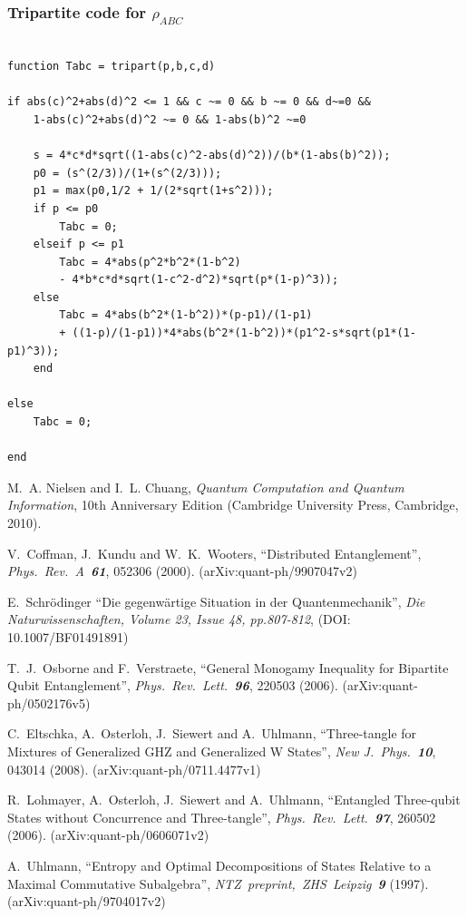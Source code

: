 \documentclass[12pt,a4paper]{article}
\numberwithin{equation}{section}
\begin{document}
\newpage

\subsubsection{Tripartite code for $\rho_{ABC}$}
\label{app:tripartiteCode}

\begin{verbatim}

function Tabc = tripart(p,b,c,d)

if abs(c)^2+abs(d)^2 <= 1 && c ~= 0 && b ~= 0 && d~=0 &&
    1-abs(c)^2+abs(d)^2 ~= 0 && 1-abs(b)^2 ~=0

    s = 4*c*d*sqrt((1-abs(c)^2-abs(d)^2))/(b*(1-abs(b)^2));
    p0 = (s^(2/3))/(1+(s^(2/3)));
    p1 = max(p0,1/2 + 1/(2*sqrt(1+s^2)));
    if p <= p0
        Tabc = 0;
    elseif p <= p1
        Tabc = 4*abs(p^2*b^2*(1-b^2)
        - 4*b*c*d*sqrt(1-c^2-d^2)*sqrt(p*(1-p)^3));
    else
        Tabc = 4*abs(b^2*(1-b^2))*(p-p1)/(1-p1)
        + ((1-p)/(1-p1))*4*abs(b^2*(1-b^2))*(p1^2-s*sqrt(p1*(1-p1)^3));
    end

else
    Tabc = 0;

end

\end{verbatim}

\newpage

\begin{thebibliography}{99}

M.~A. Nielsen
and
I.~L. Chuang,
{\it Quantum Computation and Quantum Information\/},
10th Anniversary Edition
(Cambridge University Press, Cambridge, 2010).

V.~Coffman, J.~Kundu
and
W.~K.~Wooters,
``Distributed Entanglement'',
{\it Phys.\ Rev.\ A\ \bf 61}, 052306 (2000).
(arXiv:quant-ph/9907047v2)

E.~Schr\"{o}dinger
``Die gegenwärtige Situation in der Quantenmechanik'',
{\it Die Naturwissenschaften, Volume 23, Issue 48, pp.807-812},
(DOI: 10.1007/BF01491891)

T.~J.~Osborne and F.~Verstraete,
``General Monogamy Inequality for Bipartite Qubit Entanglement'',
{\it Phys.\ Rev.\ Lett.\ \bf 96}, 220503 (2006).
(arXiv:quant-ph/0502176v5)

C.~Eltschka, A.~Osterloh, J.~Siewert and A.~Uhlmann,
``Three-tangle for Mixtures of Generalized GHZ and Generalized W States'',
{\it New J.\ Phys.\ \bf 10}, 043014 (2008).
(arXiv:quant-ph/0711.4477v1)

R.~Lohmayer, A.~Osterloh, J.~Siewert and A.~Uhlmann,
``Entangled Three-qubit States without Concurrence and Three-tangle'',
{\it Phys.\ Rev.\ Lett.\ \bf 97}, 260502 (2006).
(arXiv:quant-ph/0606071v2)

A.~Uhlmann,
``Entropy and Optimal Decompositions of States Relative to a Maximal Commutative Subalgebra'',
{\it NTZ\ preprint,\ ZHS\ Leipzig\ \bf 9} (1997).
(arXiv:quant-ph/9704017v2)

\end{thebibliography}
\end{document}

